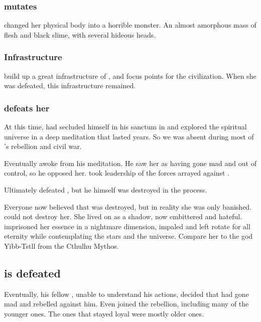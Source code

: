 \subsubsection{\Tiamat mutates}
\Tiamat changed her physical body into a horrible monster. 
An almost amorphous mass of flesh and black slime, with several hideous heads. 





\subsubsection{Infrastructure}
\Tiamat build up a great infrastructure of \nexuses, \vertices and focus points for the \draconic civilization.
When she was defeated, this infrastructure remained. 





\subsubsection{\Sethicus defeats her}
At this time, \Sethicus had secluded himself in his sanctum in  and explored the spiritual universe in a deep meditation that lasted years. 
So we was absent during most of \Tiamat's rebellion and civil war. 

Eventually \Sethicus awoke from his meditation. 
He saw her as having gone mad and out of control, so he opposed her.
\Sethicus took leadership of the forces arrayed against \Tiamat. 

Ultimately \Sethicus defeated \Tiamat, but he himself was destroyed in the process.

Everyone now believed that \Tiamat was destroyed, but in reality she was only banished. 
\Sethicus could not destroy her. 
She lived on as a shadow, now embittered and hateful. 
\Sethicus imprisoned her essence in a nightmare dimension, impaled and left rotate for all eternity while contemplating the stars and the universe.
Compare her to the god Yibb-Tstll from the Cthulhu Mythos. 









\subsection{\Sethicus is defeated}
Eventually, his fellow \ophidians, unable to understand his actions, decided that \Sethicus had gone mad and rebelled against him. 
Even \dragons joined the rebellion, including many of the younger ones. 
The ones that stayed loyal were mostly older ones. 

